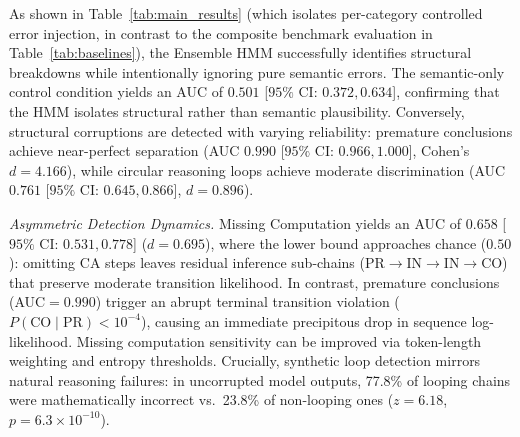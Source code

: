 \documentclass[conference]{IEEEtran}
\begin{document}
As shown in Table~\ref{tab:main_results} (which isolates per-category controlled error injection, in contrast to the composite benchmark evaluation in Table~\ref{tab:baselines}), the Ensemble HMM successfully identifies structural breakdowns while intentionally ignoring pure semantic errors. The semantic-only control condition yields an AUC of $0.501$ [$95\%$ CI: $0.372, 0.634$], confirming that the HMM isolates structural rather than semantic plausibility. Conversely, structural corruptions are detected with varying reliability: premature conclusions achieve near-perfect separation (AUC $0.990$ [$95\%$ CI: $0.966, 1.000$], Cohen's $d = 4.166$), while circular reasoning loops achieve moderate discrimination (AUC $0.761$ [$95\%$ CI: $0.645, 0.866$], $d = 0.896$).

\textit{Asymmetric Detection Dynamics.} Missing Computation yields an AUC of $0.658$ [$95\%$ CI: $0.531, 0.778$] ($d=0.695$), where the lower bound approaches chance ($0.50$): omitting CA steps leaves residual inference sub-chains (PR$\rightarrow$IN$\rightarrow$IN$\rightarrow$CO) that preserve moderate transition likelihood. In contrast, premature conclusions (AUC$=0.990$) trigger an abrupt terminal transition violation ($P(\text{CO}\mid\text{PR}) < 10^{-4}$), causing an immediate precipitous drop in sequence log-likelihood. Missing computation sensitivity can be improved via token-length weighting and entropy thresholds. Crucially, synthetic loop detection mirrors natural reasoning failures: in uncorrupted model outputs, 77.8\% of looping chains were mathematically incorrect vs.\ 23.8\% of non-looping ones ($z=6.18$, $p=6.3\times 10^{-10}$).

\begin{table}[htbp]
\caption{Controlled Error Injection Results ($B=10,000$ bootstraps). Detection Rate (\%) is evaluated at the median score threshold of clean traces.}
\begin{center}
\label{tab:main_results}
\end{center}
\end{table}
\end{document}
